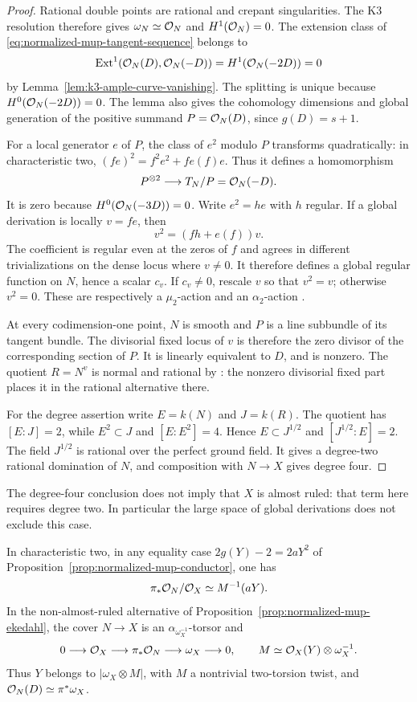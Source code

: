 \begin{proof}
Rational double points are rational and crepant singularities.
The K3 resolution therefore gives $\omega_N\simeq\mathcal O_N$ and
$H^1(\mathcal O_N)=0$. The extension class of
\eqref{eq:normalized-mup-tangent-sequence} belongs to
\[
 \operatorname{Ext}^1(\mathcal O_N(D),\mathcal O_N(-D))
 =H^1(\mathcal O_N(-2D))=0
\]
by Lemma~\ref{lem:k3-ample-curve-vanishing}. The splitting is
unique because $H^0(\mathcal O_N(-2D))=0$. The lemma also gives
the cohomology dimensions and global generation of the positive
summand $P=\mathcal O_N(D)$, since $g(D)=s+1$.

For a local generator $e$ of $P$, the class of $e^2$ modulo $P$
transforms quadratically: in characteristic two,
$(fe)^2=f^2e^2+f e(f)e$. Thus it defines a homomorphism
\[
 P^{\otimes2}\longrightarrow T_N/P=\mathcal O_N(-D).
\]
It is zero because $H^0(\mathcal O_N(-3D))=0$. Write $e^2=he$
with $h$ regular. If a global derivation is locally $v=fe$, then
\[
 v^2=(fh+e(f))v.
\]
The coefficient is regular even at the zeros of $f$ and agrees
in different trivializations on the dense locus where $v\ne0$.
It therefore defines a global regular function on $N$, hence a
scalar $c_v$. If $c_v\ne0$, rescale $v$ so that $v^2=v$;
otherwise $v^2=0$. These are respectively a $\mu_2$-action and
an $\alpha_2$-action
\cite[Proposition~2.10, author version p.~5]{MatsumotoActions}.

At every codimension-one point, $N$ is smooth and $P$ is a line
subbundle of its tangent bundle. The divisorial fixed locus of
$v$ is therefore the zero divisor of the corresponding section
of $P$. It is linearly equivalent to $D$, and is nonzero.
The quotient $R=N^v$ is normal and rational by
\cite[Proposition~4.1 and proof, author version pp.~16--17]{MatsumotoActions}:
the nonzero divisorial fixed part places it in the rational
alternative there.

For the degree assertion write $E=k(N)$ and $J=k(R)$.
The quotient has $[E:J]=2$, while $E^2\subset J$ and
$[E:E^2]=4$. Hence $E\subset J^{1/2}$ and
$[J^{1/2}:E]=2$. The field $J^{1/2}$ is rational over the
perfect ground field. It gives a degree-two rational domination
of $N$, and composition with $N\to X$ gives degree four.
\end{proof}

The degree-four conclusion does not imply that $X$ is almost
ruled: that term here requires degree two. In particular the
large space of global derivations does not exclude this case.

\begin{proposition}\label{prop:k3-picard-paracanonical}
In characteristic two, in any equality case
$2g(Y)-2=2aY^2$ of
Proposition~\ref{prop:normalized-mup-conductor}, one has
\[
 \pi_*\mathcal O_N/\mathcal O_X\simeq M^{-1}(aY).
\]
In the non-almost-ruled alternative of
Proposition~\ref{prop:normalized-mup-ekedahl}, the cover
$N\to X$ is an $\alpha_{\omega_X^{-1}}$-torsor and
\[
 0\longrightarrow\mathcal O_X\longrightarrow\pi_*\mathcal O_N
 \longrightarrow\omega_X\longrightarrow0,
 \qquad M\simeq\mathcal O_X(Y)\otimes\omega_X^{-1}.
\]
Thus $Y$ belongs to $|\omega_X\otimes M|$, with $M$ a
nontrivial two-torsion twist, and
$\mathcal O_N(D)\simeq\pi^*\omega_X$.
\end{proposition}

